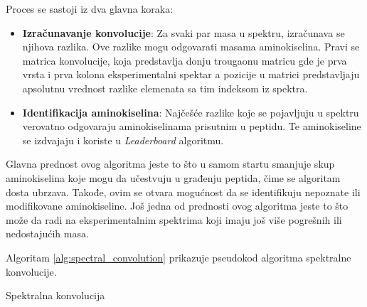 \documentclass[12pt,oneside]{memoir}
\begin{document}
Proces se sastoji iz dva glavna koraka:

\begin{itemize}
    \item \textbf{Izračunavanje konvolucije}: Za svaki par masa u spektru, izračunava se njihova razlika. Ove razlike mogu odgovarati masama aminokiselina. Pravi se matrica konvolucije, koja predstavlja donju trougaonu matricu gde je prva vrsta i prva kolona eksperimentalni spektar a pozicije u matrici predstavljaju apsolutnu vrednost razlike elemenata sa tim indeksom iz spektra.
    \item \textbf{Identifikacija aminokiselina}: Najčešće razlike koje se pojavljuju u spektru verovatno odgovaraju aminokiselinama prisutnim u peptidu. Te aminokiseline se izdvajaju i koriste u \emph{Leaderboard} algoritmu.
\end{itemize}

Glavna prednost ovog algoritma jeste to što u samom startu smanjuje skup aminokiselina koje mogu da učestvuju u građenju peptida, čime se algoritam dosta ubrzava. Takođe, ovim se otvara mogućnost da se identifikuju nepoznate ili modifikovane aminokiseline. Još jedna od prednosti ovog algoritma jeste to što može da radi na eksperimentalnim spektrima koji imaju još više pogrešnih ili nedostajućih masa.

Algoritam \ref{alg:spectral_convolution} prikazuje pseudokod algoritma spektralne konvolucije.

\begin{algorithm}[H]
\label{alg:spectral_convolution}
\caption{Spektralna konvolucija}
\SetAlgoLined
\DontPrintSemicolon
{}
\end{algorithm}
\end{document}

